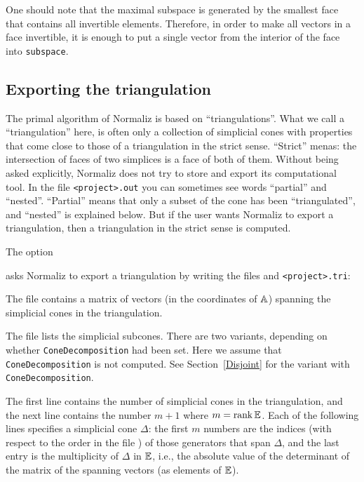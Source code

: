 One should note that the maximal subspace is generated by the smallest face that contains all invertible elements. Therefore, in order to make all vectors in a face invertible, it is enough to put a single vector from the interior of the face into \verb|subspace|.

\subsection{Exporting the triangulation}\label{Triang}

The primal algorithm of Normaliz is based on ``triangulations''. What we call a ``triangulation'' here, is often only a collection of simplicial cones with properties that come close to those of a triangulation in the strict sense. ``Strict'' menas: the intersection of faces of two simplices is a face of both of them. Without being asked explicitly, Normaliz does not try to store and export its computational tool. In the file \verb|<project>.out| you can sometimes see words ``partial'' and ``nested''. ``Partial'' means that only a subset of the cone has been ``triangulated'', and ``nested'' is explained below.
But if the user wants Normaliz to export a triangulation, then a triangulation in the strict sense is computed.

The option 
\begin{itemize}
\itemtt[Triangulation, -T]
\end{itemize}	
asks Normaliz to export a triangulation by writing the files
 and \verb|<project>.tri|:
\begin{itemize}
	
	\itemtt[tgn] The file  contains a matrix of vectors (in the
	coordinates of $\AA$) spanning the simplicial cones in
	the triangulation.
	
	\itemtt[tri]
	The file  lists the simplicial subcones. There are two variants, depending on whether \verb|ConeDecomposition| had been set. Here we assume that \verb|ConeDecomposition| is not computed. See Section~\ref{Disjoint} for the variant with \verb|ConeDecomposition|.
	
	The first line contains the number of simplicial cones
	in the triangulation, and the next line contains the
	number $m+1$ where $m=\rank \EE$. Each of the following
	lines specifies a simplicial cone $\Delta$: the first
	$m$ numbers are the indices (with respect to the order
	in the file ) of those generators that span
	$\Delta$, and the last entry is the multiplicity of
	$\Delta$ in $\EE$, i.e., the absolute value of the
	determinant of the matrix of the spanning vectors (as
	elements of $\EE$).
\end{itemize}

